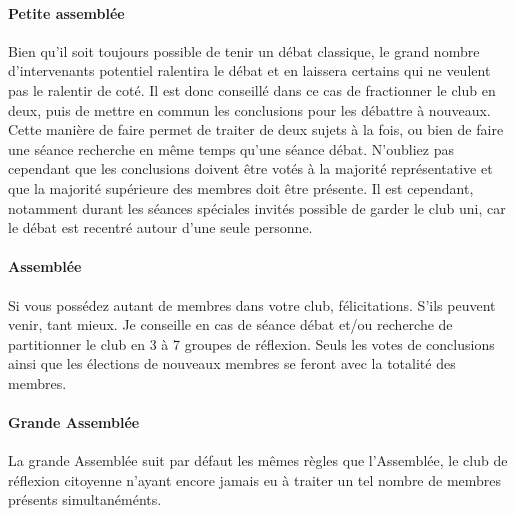 \documentclass[a4paper,12pt]{article}
\begin{document}
\paragraph{Petite assemblée}
Bien qu'il soit toujours possible de tenir un débat classique, le grand nombre d'intervenants potentiel ralentira le débat et en laissera certains qui ne veulent pas le ralentir de coté. Il est donc conseillé dans ce cas de fractionner le club en deux, puis de mettre en commun les conclusions pour les débattre à nouveaux. Cette manière de faire permet de traiter de deux sujets à la fois, ou bien de faire une séance recherche en même temps qu'une séance débat. N'oubliez pas cependant que les conclusions doivent être votés à la majorité représentative et que la majorité supérieure des membres doit être présente. Il est cependant, notamment durant les séances spéciales invités possible de garder le club uni, car le débat est recentré autour d'une seule personne.

\paragraph{Assemblée}
Si vous possédez autant de membres dans votre club, félicitations. S'ils peuvent venir, tant mieux. Je conseille en cas de séance débat et/ou recherche de partitionner le club en 3 à 7 groupes de réflexion.
Seuls les votes de conclusions ainsi que les élections de nouveaux membres se feront avec la totalité des membres.

\paragraph{Grande Assemblée}
La grande Assemblée suit par défaut les mêmes règles que l'Assemblée, le club de réflexion citoyenne n'ayant encore jamais eu à traiter un tel nombre de membres présents simultanéménts. 
\end{document}
